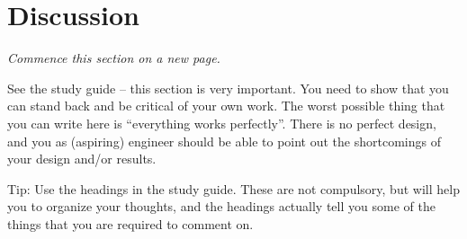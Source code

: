 
\section{Discussion}

{\slshape
Commence this section on a new page.

See the study guide -- this section is very important.  You need to show that
you can stand back and be critical of your own work. The worst possible thing
that you can write here is ``everything works perfectly''. There is no perfect
design, and you as (aspiring) engineer should be able to point out the
shortcomings of your design and/or results.

Tip: Use the headings in the study guide. These are not compulsory, but will
help you to organize your thoughts, and the headings actually tell you some of
the things that you are required to comment on.
}

\newpage



